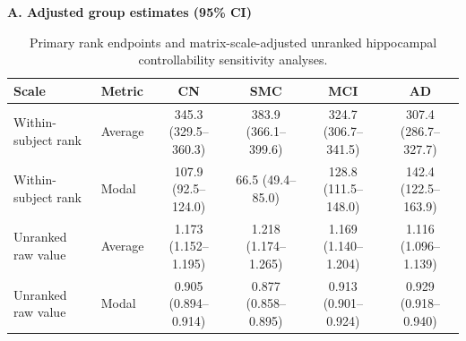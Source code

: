 \documentclass{article}
\providecommand{\DIFaddtex}[1]{{\protect\color{blue}#1}} %
\providecommand{\DIFaddbegin}{} %
\providecommand{\DIFaddend}{} %
\providecommand{\DIFaddFL}[1]{\DIFadd{#1}} %
\providecommand{\DIFaddbeginFL}{} %
\providecommand{\DIFaddendFL}{} %
\providecommand{\DIFadd}[1]{\texorpdfstring{\DIFaddtex{#1}}{#1}} %
\providecommand{\DIFchgtex}[1]{{\setlength{\fboxsep}{0pt}\colorbox{yellow}{\strut #1}}}
\providecommand{\DIFchg}[1]{\texorpdfstring{\DIFchgtex{#1}\allowbreak}{#1}}
\providecommand{\DIFchgFL}[1]{\DIFchg{#1}}
\providecommand{\DIFchgbegin}{}
\providecommand{\DIFchgend}{}
\providecommand{\DIFchgbeginFL}{}
\providecommand{\DIFchgendFL}{}
\begin{document}
\begingroup
\color{blue}
\def\DIFchg#1{#1}
\def\DIFadd#1{#1}
\def\DIFchgFL#1{#1}
\def\DIFaddFL#1{#1}
\def\DIFchgbegin{}
\def\DIFchgend{}
\def\DIFaddbegin{}
\def\DIFaddend{}
\def\DIFchgbeginFL{}
\def\DIFchgendFL{}
\def\DIFaddbeginFL{}
\def\DIFaddendFL{}
\begin{table}[!htbp]
\color{blue}
\centering
\caption{\DIFaddFL{Primary rank endpoints and matrix-scale-adjusted unranked hippocampal controllability sensitivity analyses.}}
\label{tab:rank_raw_sensitivity}
\scriptsize
\setlength{\tabcolsep}{3.2pt}
\DIFaddFL{\textbf{A. Adjusted group estimates (95\% CI)}}\par\vspace{1mm}
\begin{tabular}{llcccc}
\toprule
\DIFaddFL{Scale }\DIFaddendFL &  \DIFaddbeginFL \DIFaddFL{Metric }& \DIFaddFL{CN }& \DIFaddFL{SMC }& \DIFaddFL{MCI }& \DIFaddFL{AD}\DIFaddendFL \\
\DIFaddbeginFL \midrule
\DIFaddFL{Within-subject rank }& \DIFaddFL{Average }& \DIFaddFL{345.3 (329.5--360.3) }& \DIFaddFL{383.9 (366.1--399.6) }& \DIFaddFL{324.7 (306.7--341.5) }& \DIFaddFL{307.4 (286.7--327.7)}\\
\DIFaddFL{Within-subject rank }& \DIFaddFL{Modal }& \DIFaddFL{107.9 (92.5--124.0) }& \DIFaddFL{66.5 (49.4--85.0) }& \DIFaddFL{128.8 (111.5--148.0) }& \DIFaddFL{142.4 (122.5--163.9)}\\
\DIFaddFL{Unranked raw value }& \DIFaddFL{Average }& \DIFaddFL{1.173 (1.152--1.195) }& \DIFaddFL{1.218 (1.174--1.265) }& \DIFaddFL{1.169 (1.140--1.204) }& \DIFaddFL{1.116 (1.096--1.139)}\\
\DIFaddFL{Unranked raw value }& \DIFaddFL{Modal }& \DIFaddFL{0.905 (0.894--0.914) }& \DIFaddFL{0.877 (0.858--0.895) }& \DIFaddFL{0.913 (0.901--0.924) }& \DIFaddFL{0.929 (0.918--0.940)}\\
\bottomrule
\end{tabular}
\DIFaddendFL 


\end{table}
\end{document}
